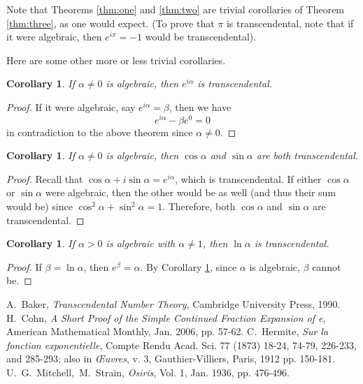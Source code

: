 \documentclass[12pt]{article}
\newtheorem{cor}[thm]{Corollary}
\begin{document}
Note that Theorems \ref{thm:one} and \ref{thm:two} are trivial corollaries of Theorem \ref{thm:three}, as one would expect. (To prove that $\pi$ is transcendental, note that if it were algebraic, then $e^{i\pi}=-1$ would be transcendental).

Here are some other more or less trivial corollaries.

\begin{cor} \label{cor:four}If $\alpha \neq 0$ is algebraic, then $e^{i\alpha}$ is transcendental.
\end{cor}
\begin{proof}
If it were algebraic, say $e^{i\alpha}=\beta$, then we have
\[e^{i\alpha}-\beta e^0=0\]
in contradiction to the above theorem since $\alpha\neq 0$.
\end{proof}

\begin{cor} If $\alpha\neq 0$ is algebraic, then $\cos \alpha$ and $\sin \alpha$ are both transcendental.
\end{cor}
\begin{proof}
Recall that $\cos\alpha + i\sin\alpha=e^{i\alpha}$, which is transcendental. If either $\cos\alpha$ or $\sin\alpha$ were algebraic, then the other would be as well (and thus their sum would be) since $\cos^2 \alpha+\sin^2 \alpha=1$. Therefore, both $\cos \alpha$ and $\sin\alpha$ are transcendental.
\end{proof}

\begin{cor} If $\alpha>0$ is algebraic with $\alpha\neq 1$, then $\ln\alpha$ is transcendental.
\end{cor}
\begin{proof}
If $\beta=\ln\alpha$, then $e^\beta=\alpha$. By Corollary \ref{cor:four}, since $\alpha$ is algebraic, $\beta$ cannot be.
\end{proof}

\begin{thebibliography}{10}
A.~Baker, \emph{Transcendental Number Theory}, Cambridge University Press, 1990.
H.~Cohn, \emph{A Short Proof of the Simple Continued Fraction Expansion of e}, American Mathematical Monthly, Jan. 2006, pp. 57-62.
C.~Hermite, \emph{Sur la fonction exponentielle}, Compte Rendu Acad. Sci. 77 (1873) 18-24, 74-79, 226-233, and 285-293; also in \emph{{\OE}uvres}, v. 3, Gauthier-Villiers, Paris, 1912 pp. 150-181.
U.~G.~Mitchell,~M.~Strain, \emph{Osiris}, Vol. 1, Jan. 1936, pp. 476-496.
\end{thebibliography}

\end{document}

